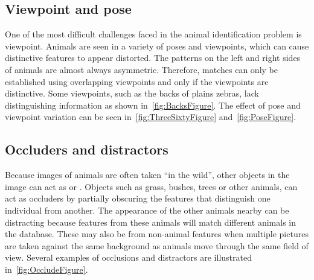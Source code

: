         \PlainsFigure{}

        \HardCaseFigure{}

        \GirMasaiFigure{}

        \GrevysFigure{}

        \HumpbackFig{}

    \FloatBarrier{}
    \subsection{Viewpoint and pose}
        One of the most difficult challenges faced in the animal identification problem is viewpoint. Animals are seen
        in a variety of poses and viewpoints, which can cause distinctive features to appear distorted. The patterns on
        the left and right sides of animals are almost always asymmetric. Therefore, matches can only be established
        using overlapping viewpoints and only if the viewpoints are distinctive. Some viewpoints, such as the backs of
        plains zebras, lack distinguishing information as shown in~\cref{fig:BacksFigure}. The effect of pose and
        viewpoint variation can be seen in~\cref{fig:ThreeSixtyFigure} and~\cref{fig:PoseFigure}.

        \BacksFigure{}

        \ThreeSixtyFigure{}

        \PoseFigure{}

    \FloatBarrier{}
    \subsection{Occluders and distractors}
        Because images of animals are often taken ``in the wild'', other objects in the image can act as
         or . Objects such as grass, bushes, trees or other animals, can act
        as occluders by partially obscuring the features that distinguish one individual from another. The appearance of
        the other animals nearby can be distracting because features from these animals will match different animals in
        the database. These  may also be from non-animal features when multiple pictures are
        taken against the same background as animals move through the same field of view. Several examples of occlusions
        and distractors are illustrated in~\cref{fig:OccludeFigure}.

        \OccludeFigure{}

    \FloatBarrier{}

